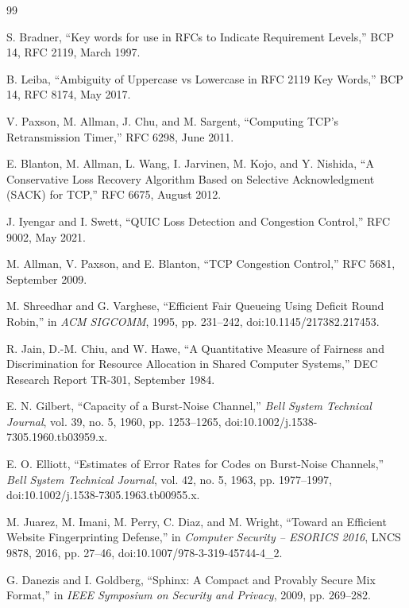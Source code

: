 \documentclass[11pt,oneside]{article}
\begin{document}
\begingroup
\small
\begin{thebibliography}{99}
\setlength{\itemsep}{0.2\baselineskip}

S. Bradner,
``Key words for use in RFCs to Indicate Requirement Levels,''
BCP 14, RFC 2119, March 1997.

B. Leiba,
``Ambiguity of Uppercase vs Lowercase in RFC 2119 Key Words,''
BCP 14, RFC 8174, May 2017.

V. Paxson, M. Allman, J. Chu, and M. Sargent,
``Computing TCP's Retransmission Timer,''
RFC 6298, June 2011.

E. Blanton, M. Allman, L. Wang, I. Jarvinen, M. Kojo, and Y. Nishida,
``A Conservative Loss Recovery Algorithm Based on Selective Acknowledgment (SACK) for TCP,''
RFC 6675, August 2012.

J. Iyengar and I. Swett,
``QUIC Loss Detection and Congestion Control,''
RFC 9002, May 2021.

M. Allman, V. Paxson, and E. Blanton,
``TCP Congestion Control,''
RFC 5681, September 2009.

M. Shreedhar and G. Varghese,
``Efficient Fair Queueing Using Deficit Round Robin,''
in \emph{ACM SIGCOMM}, 1995, pp. 231--242,
doi:10.1145/217382.217453.

R. Jain, D.-M. Chiu, and W. Hawe,
``A Quantitative Measure of Fairness and Discrimination for Resource Allocation in Shared Computer Systems,''
DEC Research Report TR-301, September 1984.

E. N. Gilbert,
``Capacity of a Burst-Noise Channel,''
\emph{Bell System Technical Journal}, vol. 39, no. 5, 1960, pp. 1253--1265,
doi:10.1002/j.1538-7305.1960.tb03959.x.

E. O. Elliott,
``Estimates of Error Rates for Codes on Burst-Noise Channels,''
\emph{Bell System Technical Journal}, vol. 42, no. 5, 1963, pp. 1977--1997,
doi:10.1002/j.1538-7305.1963.tb00955.x.

M. Juarez, M. Imani, M. Perry, C. Diaz, and M. Wright,
``Toward an Efficient Website Fingerprinting Defense,''
in \emph{Computer Security -- ESORICS 2016}, LNCS 9878, 2016, pp. 27--46,
doi:10.1007/978-3-319-45744-4\_2.

G. Danezis and I. Goldberg,
``Sphinx: A Compact and Provably Secure Mix Format,''
in \emph{IEEE Symposium on Security and Privacy}, 2009, pp. 269--282.


\end{thebibliography}
\end{document}
